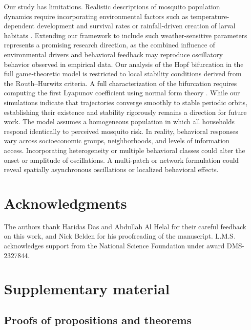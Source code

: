 \documentclass{article}
\theoremstyle{remark}
\theoremstyle{custom} %
\begin{document}
Our study has limitations. Realistic descriptions of mosquito population dynamics require incorporating environmental factors such as temperature-dependent development and survival rates \cite{lana2018assessment} or rainfall-driven creation of larval habitats \cite{abdelrazec2017mathematical}. Extending our framework to include such weather-sensitive parameters represents a promising research direction, as the combined influence of environmental drivers and behavioral feedback may reproduce oscillatory behavior observed in empirical data. Our analysis of the Hopf bifurcation in the full game-theoretic model is restricted to local stability conditions derived from the Routh--Hurwitz criteria. A full characterization of the bifurcation requires computing the first Lyapunov coefficient using normal form theory \cite{kuznetsov1998elements, wiggins2003introduction}. While our simulations indicate that trajectories converge smoothly to stable periodic orbits, establishing their existence and stability rigorously remains a direction for future work. The model assumes a homogeneous population in which all households respond identically to perceived mosquito risk. In reality, behavioral responses vary across socioeconomic groups, neighborhoods, and levels of information access. Incorporating heterogeneity or multiple behavioral classes could alter the onset or amplitude of oscillations. A multi-patch or network formulation could reveal spatially asynchronous oscillations or localized behavioral effects. 


\section{Acknowledgments} 
\label{acknowledgments}

The authors thank Haridas Das and Abdullah Al Helal for their careful feedback on this work, and Nick Belden for his proofreading of the manuscript. L.M.S. acknowledges support from the National Science Foundation under award DMS-2327844.



  
  
\newpage

\section{Supplementary material}


\subsection{Proofs of propositions and theorems}
\end{document}
